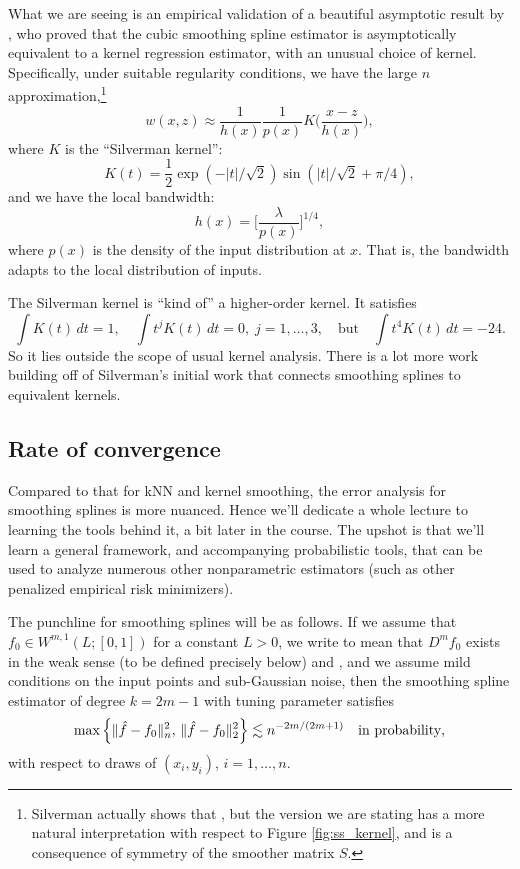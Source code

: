 \documentclass{article}
\begin{document}
What we are seeing is an empirical validation of a beautiful asymptotic result
by \citet{silverman1984spline}, who proved that the cubic smoothing spline
estimator is asymptotically equivalent to a kernel regression estimator, with an 
unusual choice of kernel. Specifically, under suitable regularity conditions, we
have the large $n$ approximation,\footnote{Silverman actually shows that
  ,
  but the version we are stating has a more natural interpretation with respect
  to Figure \ref{fig:ss_kernel}, and is a consequence of symmetry of the
  smoother matrix $S$.}  
\[
w(x, z) \approx \frac{1}{h(x)} \frac{1}{p(x)} K\bigg( \frac{x-z}{h(x)} \bigg), 
\]
where $K$ is the ``Silverman kernel'': 
\[
K(t) = \frac{1}{2} \exp(-|t|/\sqrt{2}) \sin(|t|/\sqrt{2} + \pi/4), 
\]
and we have the local bandwidth: 
\[
h(x) = \bigg[ \frac{\lambda}{p(x)} \bigg]^{1/4},
\]
where $p(x)$ is the density of the input distribution at $x$. That is, the
bandwidth adapts to the local distribution of inputs. 

The Silverman kernel is ``kind of'' a higher-order kernel. It satisfies 
\[
\int K(t) \, dt = 1, \quad
\int t^j K(t) \, dt = 0, \; j=1,\dots,3, 
\quad \text{but} \quad 
\int t^4 K(t) \, dt = -24.
\]
So it lies outside the scope of usual kernel analysis. There is a lot more work
building off of Silverman's initial work that connects smoothing splines to
equivalent kernels. 

\subsection{Rate of convergence} 

Compared to that for kNN and kernel smoothing, the error analysis for smoothing
splines is more nuanced. Hence we'll dedicate a whole lecture to learning the
tools behind it, a bit later in the course. The upshot is that we'll learn a
general framework, and accompanying probabilistic tools, that can be used 
to analyze numerous other nonparametric estimators (such as other penalized 
empirical risk minimizers).        

The punchline for smoothing splines will be as follows. If we assume that $f_0
\in W^{m,1}(L; [0,1])$ for a constant $L>0$, we write to mean that $D^m f_0$
exists in the weak sense (to be defined precisely below) and , and we assume mild conditions on the input 
points and sub-Gaussian noise, then the smoothing spline estimator of degree
$k=2m-1$ with tuning parameter  satisfies    
\[
\max \Big\{ \|\hat{f} - f_0\|_n^2 , \, \|\hat{f} - f_0\|_2^2 \Big\} \lesssim
n^{-2m/(2m+1)} \quad \text{in probability},
\]
with respect to draws of $(x_i,y_i)$, $i=1,\dots,n$.
\end{document}
